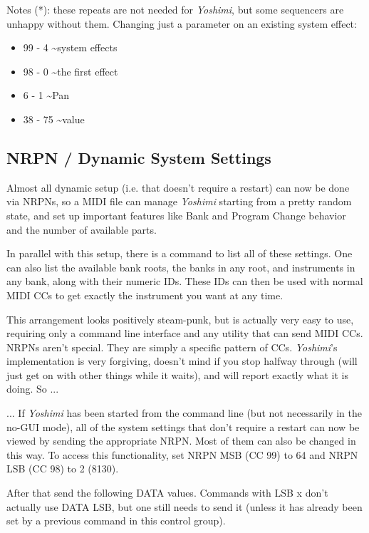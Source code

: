    Notes (*): these repeats are not needed for \textsl{Yoshimi},
   but some sequencers are unhappy without them.
   Changing just a parameter on an existing system effect:

   \begin{itemize}
      \item 99 -   4 \textasciitilde system effects
      \item 98 -   0 \textasciitilde the first effect
      \item 6 -   1 \textasciitilde Pan
      \item 38 -  75 \textasciitilde value
   \end{itemize}

\subsection{NRPN / Dynamic System Settings}
\label{subsection:nrpns_dynamic_system_settings}

   Almost all dynamic setup (i.e. that doesn't require a restart) can now be
   done via NRPNs, so a MIDI file can manage \textsl{Yoshimi} starting from a
   pretty random state, and set up important features like Bank and Program
   Change behavior and the number of available parts.

   In parallel with this setup, there is a command to list all of these
   settings. One can also list the available bank roots, the banks in any
   root, and instruments in any bank, along with their numeric IDs. These IDs
   can then be used with normal MIDI CCs to get exactly the instrument you
   want at any time.

   This arrangement looks positively steam-punk, but is actually very easy to
   use, requiring only a command line interface and any utility that can send
   MIDI CCs. NRPNs aren't special. They are simply a specific pattern of CCs.
   \textsl{Yoshimi}'s implementation is very forgiving, doesn't mind if you
   stop halfway through (will just get on with other things while it waits),
   and will report exactly what it is doing.  So ...

   ... If \textsl{Yoshimi} has been started from the command line (but not
   necessarily in the no-GUI mode), all of the system settings that don't
   require a restart can now be viewed by sending the appropriate NRPN. Most
   of them can also be changed in this way.
   To access this functionality, set NRPN MSB (CC 99) to 64 and NRPN LSB (CC
   98) to 2 (8130).

   After that send the following DATA values. Commands with LSB x don't
   actually use DATA LSB, but one still needs to send it (unless it has
   already been set by a previous command in this control group).

